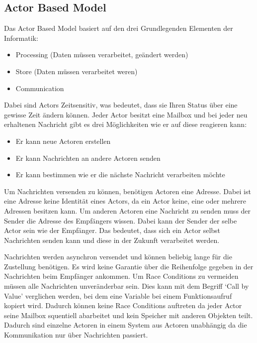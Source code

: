 \subsection{Actor Based Model}
\label{section:Actor Based Model}

Das Actor Based Model basiert auf den drei Grundlegenden Elementen der Informatik:

\begin{itemize}
  \item Processing (Daten müssen verarbeitet, geändert werden)
  \item Store (Daten müssen verarbeitet weren)
  \item Communication
\end{itemize}

Dabei sind Actors Zeitsensitiv, was bedeutet, dass sie Ihren Status über eine gewisse Zeit ändern können. Jeder Actor besitzt eine Mailbox und bei jeder neu erhaltenen Nachricht gibt es drei Möglichkeiten wie er auf diese reagieren kann:

\begin{itemize}
  \item Er kann neue Actoren erstellen
  \item Er kann Nachrichten an andere Actoren senden
  \item Er kann bestimmen wie er die nächste Nachricht verarbeiten möchte
\end{itemize}

Um Nachrichten versenden zu können, benötigen Actoren eine Adresse. Dabei ist eine Adresse keine Identität eines Actors, da ein Actor keine, eine oder mehrere Adressen besitzen kann. Um anderen Actoren eine Nachricht zu senden muss der Sender die Adresse des Empfängers wissen. Dabei kann der Sender der selbe Actor sein wie der Empfänger. Das bedeutet, dass sich ein Actor selbst Nachrichten senden kann und diese in der Zukunft verarbeitet werden. \cite[]{Erb2012}

Nachrichten werden asynchron versendet und können beliebig lange für die Zustellung benötigen. Es wird keine Garantie über die Reihenfolge gegeben in der Nachrichten beim Empfänger ankommen. Um Race Conditions zu vermeiden müssen alle Nachrichten unveränderbar sein. Dies kann mit dem Begriff `Call by Value' verglichen werden, bei dem eine Variable bei einem Funktionsaufruf kopiert wird. Dadurch können keine Race Conditions auftreten da jeder Actor seine Mailbox squentiell abarbeitet und kein Speicher mit anderen Objekten teilt. Dadurch sind einzelne Actoren in einem System aus Actoren unabhängig da die Kommunikation nur über Nachrichten passiert. \cite[]{Erb2012}

